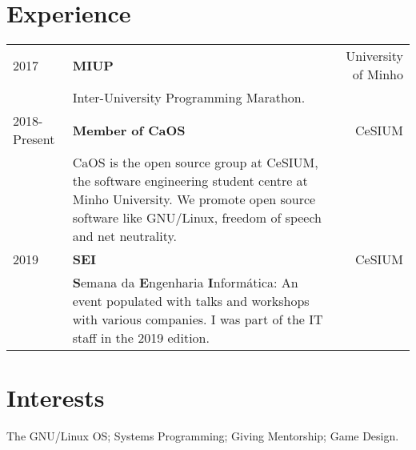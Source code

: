 \documentclass{article}
\begin{document}
\begin{textblock}{7.3}
    \section{Experience}
    \begin{tabular}{lp{8.4cm}r}
        2017 & \textbf{MIUP} & University of Minho\\
        & Inter-University Programming Marathon. &\\
        2018-Present & \textbf{Member of CaOS} & CeSIUM\\
        & CaOS is the open source group at CeSIUM, the software engineering
        student centre at Minho University. We promote open source software
        like GNU/Linux, freedom of speech and net neutrality. &\\
        2019 & \textbf{SEI} & CeSIUM \\
        & \textbf{S}emana da \textbf{E}ngenharia \textbf{I}nformática: An event
        populated with talks and workshops with various companies. I was part of
        the IT staff in the 2019 edition. &\\
    \end{tabular}

    \section{Interests}
    The GNU/Linux OS; Systems Programming; Giving Mentorship; Game Design.

\end{textblock}
\end{document}
